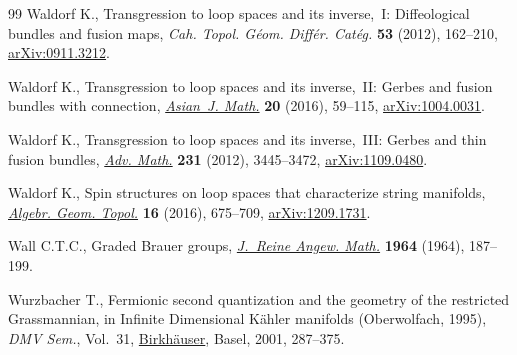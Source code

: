 \documentclass[pdftex]{sigma}
\numberwithin{equation}{section}
\begin{document}
\begin{thebibliography}{99}
Waldorf K., Transgression to loop spaces and its inverse,~{I}: {D}iffeological
 bundles and fusion maps, \textit{Cah. Topol. G\'eom. Diff\'er. Cat\'eg.}
 \textbf{53} (2012), 162--210, \href{https://arxiv.org/abs/0911.3212}{arXiv:0911.3212}.

Waldorf K., Transgression to loop spaces and its inverse,~{II}: {G}erbes and
 fusion bundles with connection, \href{https://doi.org/10.4310/AJM.2016.v20.n1.a4}{\textit{Asian~J. Math.}} \textbf{20} (2016),
 59--115, \href{https://arxiv.org/abs/1004.0031}{arXiv:1004.0031}.

Waldorf K., Transgression to loop spaces and its inverse,~{III}: {G}erbes and
 thin fusion bundles,  \href{https://doi.org/10.1016/j.aim.2012.08.016}{\textit{Adv. Math.}} \textbf{231} (2012), 3445--3472,
 \href{https://arxiv.org/abs/1109.0480}{arXiv:1109.0480}.

Waldorf K., Spin structures on loop spaces that characterize string manifolds,
 \href{https://doi.org/10.2140/agt.2016.16.675}{\textit{Algebr. Geom. Topol.}} \textbf{16} (2016), 675--709,
 \href{https://arxiv.org/abs/1209.1731}{arXiv:1209.1731}.

Wall C.T.C., Graded {B}rauer groups, \href{https://doi.org/10.1515/crll.1964.213.187}{\textit{J.~Reine Angew. Math.}}
 \textbf{1964} (1964), 187--199.

Wurzbacher T., Fermionic second quantization and the geometry of the restricted
 {G}rassmannian, in Infinite {D}imensional {K}\"ahler manifolds
 ({O}berwolfach, 1995), \textit{DMV Sem.}, Vol.~31, \href{https://doi.org/10.1007/978-3-0348-8227-9_6}{Birkh\"auser}, Basel, 2001,
 287--375.

\end{thebibliography}\LastPageEnding
\end{document}

